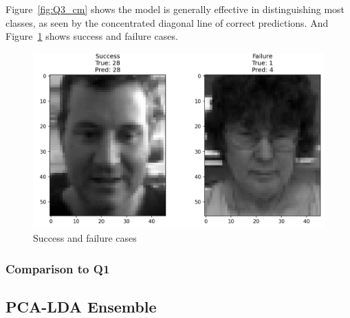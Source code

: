 Figure~\ref{fig:Q3_cm} shows the model is generally effective in distinguishing most classes, as seen by the concentrated diagonal line of correct predictions. And Figure~\ref{fig:Q3_cases} shows success and failure cases.

\begin{figure}[h]
	\centering
	\includegraphics[width=0.8\linewidth]{Ressources/Q3_cases.png}
	
	\caption{Success and failure cases}
	\label{fig:Q3_cases}
\end{figure}

\subsubsection{Comparison to Q1}

\subsection{PCA-LDA Ensemble}

